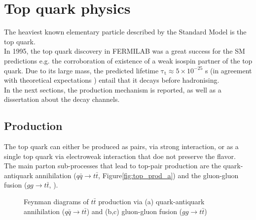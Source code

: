 \section{Top quark physics}
The heaviest known elementary particle described by the Standard Model is the top quark.\\
In 1995, the top quark discovery in FERMILAB \cite{CDF,D0} was a great success for the SM predictions e.g. the corroboration of existence  of a weak isospin partner of the top quark.
Due to its large mass, the predicted lifetime $\mathrm{\tau_{t} \approx 5\times 10^{−25}}$ s (in agreement with theoretical expectations \cite{LHcb_top}) entail that it decays before hadronising.\\
In the next sections, the production mechanism is reported, as well as a dissertation about the decay channels.
\subsection{Production}
The top quark can either be produced as pairs, via strong interaction, or as a single top quark via electroweak interaction that doe not preserve the flavor.\\
The main parton sub-processes that lead to top-pair production are the quark-antiquark annihilation ($q\bar{q}\rightarrow t\bar{t}$, Figure\ref{fig:top_prod_a}) and the gluon-gluon fusion ($gg\rightarrow t\bar{t}$, ).\\
\begin{figure}[h]
	\centering
	\quad
	\quad
	\caption{Feynman diagrams of $t\bar{t}$ production via (a) quark-antiquark annihilation ($q\bar{q}\rightarrow t\bar{t}$) and (b,c) gluon-gluon fusion ($gg\rightarrow t\bar{t}$) }
\end{figure}
